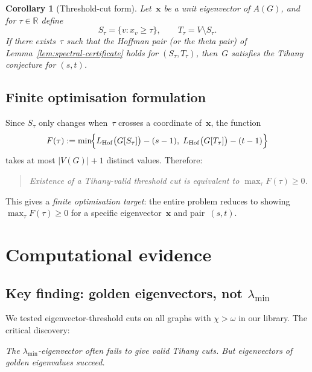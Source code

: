 \documentclass[11pt,a4paper]{amsart}
\theoremstyle{plain}
\newtheorem{corollary}[theorem]{Corollary}
\theoremstyle{definition}
\theoremstyle{remark}
\newcommand{\R}{\mathbb{R}}
\newcommand{\chr}{\chi}
\newcommand{\om}{\omega}
\newcommand{\LHof}{L_{\mathrm{Hof}}}
\begin{document}
\begin{corollary}[Threshold-cut form]\label{cor:threshold}
Let~$\mathbf{x}$ be a unit eigenvector of $A(G)$, and for $\tau\in\R$ define
\[
  S_\tau = \{v : x_v \geq \tau\},
  \qquad
  T_\tau = V\setminus S_\tau.
\]
If there exists~$\tau$ such that the Hoffman pair (or the theta pair) of
Lemma~\ref{lem:spectral-certificate} holds for $(S_\tau, T_\tau)$, then~$G$
satisfies the Tihany conjecture for $(s,t)$.
\end{corollary}

\subsection{Finite optimisation formulation}\label{ssec:finite-opt}

Since $S_\tau$ only changes when~$\tau$ crosses a coordinate of~$\mathbf{x}$,
the function
\begin{equation}\label{eq:F-tau}
  F(\tau)
  := \min\!\Bigl\{
       \LHof\bigl(G[S_\tau]\bigr) - (s-1),\;
       \LHof\bigl(G[T_\tau]\bigr) - (t-1)
     \Bigr\}
\end{equation}
takes at most $|V(G)| + 1$ distinct values.  Therefore:

\begin{quote}
\itshape Existence of a Tihany-valid threshold cut is equivalent to
$\max_\tau F(\tau) \geq 0$.
\end{quote}

This gives a \emph{finite optimisation target}: the entire problem reduces to
showing $\max_\tau F(\tau) \geq 0$ for a specific eigenvector~$\mathbf{x}$ and
pair~$(s,t)$.

\section{Computational evidence}\label{sec:evidence}

\subsection{Key finding: golden eigenvectors, not \texorpdfstring{$\lambda_{\min}$}{λ\_min}}

We tested eigenvector-threshold cuts on all graphs with $\chr > \om$ in our
library.  The critical discovery:

\emph{The $\lambda_{\min}$-eigenvector often fails to give valid Tihany cuts.
But eigenvectors of golden eigenvalues succeed.}
\end{document}

